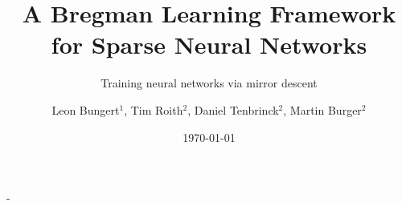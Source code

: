 \documentclass[final, 12pt]{beamer}
\title[]{A Bregman Learning Framework for
Sparse Neural Networks}
\subtitle{Training neural networks via mirror descent}
\author[T. Roith]{Leon Bungert$^1$, Tim Roith$^2$, Daniel Tenbrinck$^2$, Martin Burger$^2$}
\institute[FAU]{Friedrich-Alexander Universität Erlangen-Nürnberg, Department Mathematik}
\date{\today}
\begin{document}
\begin{frame}{-}{}
%
%
%
%
%
%
%
\end{frame}
\end{document}
